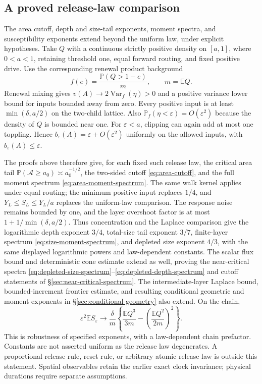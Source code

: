 \documentclass[11pt]{article}
\numberwithin{equation}{section}
\theoremstyle{definition}
\newcommand{\E}{\mathbb E}
\newcommand{\Prob}{\mathbb P}
\newcommand{\Var}{\operatorname{Var}}
\begin{document}
\subsection{A proved release-law comparison}\label{sec:release-comparison}
The area cutoff, depth and size-tail exponents, moment spectra, and susceptibility exponents extend beyond the uniform law, under explicit hypotheses. Take $Q$ with a continuous strictly positive density on $[a,1]$, where $0<a<1$, retaining threshold one, equal forward routing, and fixed positive drive. Use the corresponding renewal product background
\[
 f(e)=\frac{\Prob(Q>1-e)}m,\qquad m=\E Q.
\]
Renewal mixing gives $v(A)\to2\Var_f(\eta)>0$ and a positive variance lower bound for inputs bounded away from zero. Every positive input is at least $\min(\delta,a/2)$ on the two-child lattice. Also $\Prob_f(\eta<\varepsilon)=O(\varepsilon^2)$ because the density of $Q$ is bounded near one. For $\varepsilon<a$, clipping can again add at most one toppling. Hence
$b_\varepsilon(A)=\varepsilon+O(\varepsilon^2)$ uniformly on the allowed inputs, with $b_\varepsilon(A)\le\varepsilon$.

The proofs above therefore give, for each fixed such release law, the critical area tail $\Prob(\mathcal A\ge a_0)\asymp a_0^{-1/2}$, the two-sided cutoff \eqref{eq:area-cutoff}, and the full moment spectrum \eqref{eq:area-moment-spectrum}. The same walk kernel applies under equal routing; the minimum positive input replaces $1/4$, and $Y_L\le S_L\le Y_L/a$ replaces the uniform-law comparison. The response noise remains bounded by one, and the layer overshoot factor is at most $1+1/\min(\delta,a/2)$. Thus concentration and the Laplace comparison give the logarithmic depth exponent $3/4$, total-size tail exponent $3/7$, finite-layer spectrum \eqref{eq:size-moment-spectrum}, and depleted size exponent $4/3$, with the same displayed logarithmic powers and law-dependent constants. The scalar flux bound and deterministic cone estimate extend as well, proving the near-critical spectra \eqref{eq:depleted-size-spectrum}--\eqref{eq:depleted-depth-spectrum} and cutoff statements of \S\ref{sec:near-critical-spectrum}. The intermediate-layer Laplace bound, bounded-increment frontier estimate, and resulting conditional geometric and moment exponents in \S\ref{sec:conditional-geometry} also extend. On the chain,
\begin{equation}\label{eq:general-chain-susceptibility}
 \varepsilon^2\E S_\varepsilon\longrightarrow
 \frac\delta m\left\{\frac{\E Q^3}{3m}
 -\left(\frac{\E Q^2}{2m}\right)^2\right\}.
\end{equation}
This is robustness of specified exponents, with a law-dependent chain prefactor. Constants are not asserted uniform as the release law degenerates. A proportional-release rule, reset rule, or arbitrary atomic release law is outside this statement. Spatial observables retain the earlier exact clock invariance; physical durations require separate assumptions.
\end{document}
